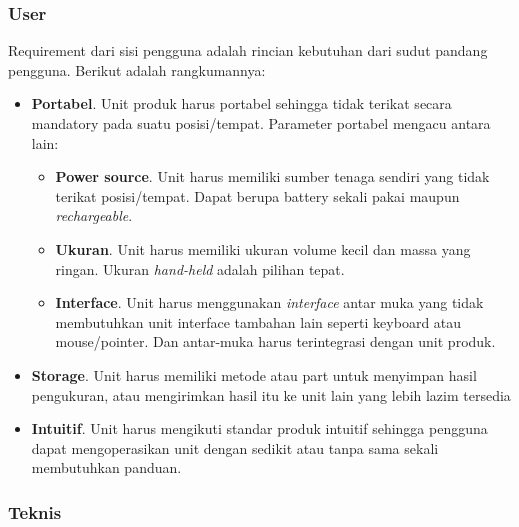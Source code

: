 \documentclass[12pt,]{article}
\begin{document}
	\subsubsection{User}
	Requirement dari sisi pengguna adalah rincian kebutuhan dari sudut pandang pengguna.
	Berikut adalah rangkumannya:
	\begin{itemize}
		\item \textbf{Portabel}. Unit produk harus portabel sehingga tidak terikat secara mandatory
		pada suatu posisi/tempat.
		Parameter portabel mengacu antara lain:
		\begin{itemize}
			\item \textbf{Power source}. Unit harus memiliki sumber tenaga sendiri yang tidak terikat posisi/tempat.
			Dapat berupa battery sekali pakai maupun \textit{rechargeable}.

			\item \textbf{Ukuran}. Unit harus memiliki ukuran volume kecil dan massa yang ringan.
			Ukuran \textit{hand-held} adalah pilihan tepat.

			\item \textbf{Interface}. Unit harus menggunakan \textit{interface} antar muka yang tidak membutuhkan unit
			interface tambahan lain seperti keyboard atau mouse/pointer.
			Dan antar-muka harus terintegrasi dengan unit produk.

		\end{itemize}

		\item \textbf{Storage}. Unit harus memiliki metode atau part untuk menyimpan hasil pengukuran,
		atau mengirimkan hasil itu ke unit lain yang lebih lazim tersedia

		\item \textbf{Intuitif}. Unit harus mengikuti standar produk intuitif sehingga pengguna
		dapat mengoperasikan unit dengan sedikit atau tanpa sama sekali membutuhkan panduan.
	\end{itemize}

	\subsubsection{Teknis}
\end{document}
